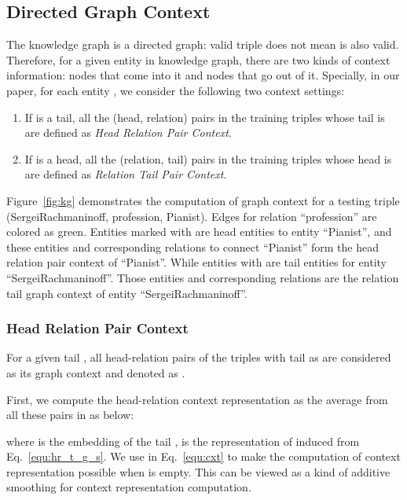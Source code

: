 \documentclass[11pt,a4paper]{article}
\begin{document}
\subsection{Directed Graph Context}

The knowledge graph is a directed graph: valid triple  does not mean  is also valid. Therefore, for a given entity in knowledge graph, there are two kinds of context information: nodes that come into it and nodes that go out of it.
Specially, in our paper, for each entity , we consider the following two context settings:
\begin{enumerate} [leftmargin=10pt]
\setlength{\itemsep}{0pt}
\setlength{\parskip}{0pt}
    \item If  is a tail, all the (head, relation) pairs in the training triples whose tail is  are defined as \textit{Head Relation Pair Context}.
    \item If  is a head, all the (relation, tail) pairs in the training triples whose head is  are defined as \textit{Relation Tail Pair Context}.
\end{enumerate}
Figure~\ref{fig:kg} demonstrates the computation of graph context for a testing triple (SergeiRachmaninoff, profession, Pianist). Edges for relation ``profession'' are colored as green. Entities marked with  are head entities to entity ``Pianist'', and these entities and corresponding relations to connect ``Pianist'' form the head relation pair context of ``Pianist''.   While entities with  are tail entities for entity ``SergeiRachmaninoff''. Those entities and corresponding relations are the relation tail graph context of entity ``SergeiRachmaninoff''. 

\subsubsection{Head Relation Pair Context}
For a given tail , all head-relation pairs  of the triples with tail as  are considered as its graph context and denoted as .







First, we compute the head-relation context representation  as the average from all these pairs in  as below:


where  is the embedding of the tail ,  is the representation of  induced from Eq.~\ref{equ:hr_t_g_s}. We use  in Eq.~\ref{equ:cxt} to make the computation of context representation possible when  is empty. 
This can be viewed as a kind of additive smoothing for context representation computation.
\end{document}
